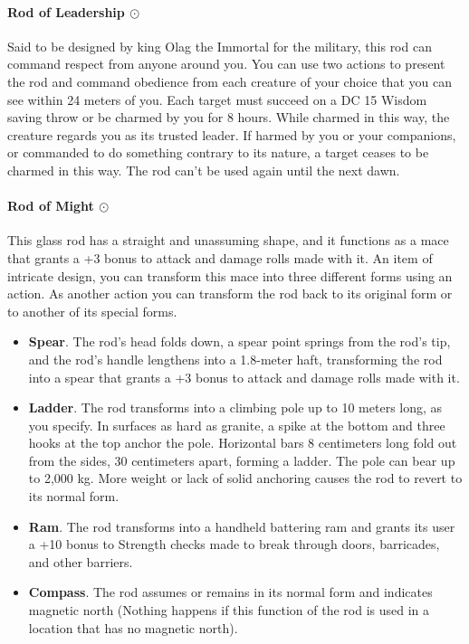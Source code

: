 \paragraph{Rod of Leadership $\odot$}
    Said to be designed by king Olag the Immortal for the military, this rod can command respect from anyone around you.
    You can use two actions to present the rod and command obedience from each creature of your choice that you can see within 24 meters of you.
    Each target must succeed on a DC 15 Wisdom saving throw or be charmed by you for 8 hours.
    While charmed in this way, the creature regards you as its trusted leader.
    If harmed by you or your companions, or commanded to do something contrary to its nature, a target ceases to be charmed in this way.
    The rod can't be used again until the next dawn.
\paragraph{Rod of Might $\odot$} %
    This glass rod has a straight and unassuming shape, and it functions as a mace that grants a +3 bonus to attack and damage rolls made with it.
    An item of intricate design, you can transform this mace into three different forms using an action.
    As another action you can transform the rod back to its original form or to another of its special forms.
    \begin{itemize}
        \item \textbf{Spear}.
        The rod's head folds down, a spear point springs from the rod's tip, and the rod's handle lengthens into a 1.8-meter haft, transforming the rod into a spear that grants a +3 bonus to attack and damage rolls made with it.
        \item \textbf{Ladder}.
        The rod transforms into a climbing pole up to 10 meters long, as you specify.
        In surfaces as hard as granite, a spike at the bottom and three hooks at the top anchor the pole.
        Horizontal bars 8 centimeters long fold out from the sides, 30 centimeters apart, forming a ladder.
        The pole can bear up to 2,000 kg.
        More weight or lack of solid anchoring causes the rod to revert to its normal form.
        \item \textbf{Ram}.
        The rod transforms into a handheld battering ram and grants its user a +10 bonus to Strength checks made to break through doors, barricades, and other barriers.
        \item \textbf{Compass}.
        The rod assumes or remains in its normal form and indicates magnetic north (Nothing happens if this function of the rod is used in a location that has no magnetic north).
    \end{itemize}

